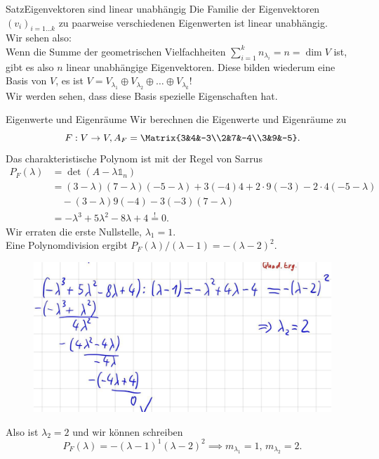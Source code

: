 \begin{Satz}{Satz}{Eigenvektoren sind linear unabhängig}
Die Familie der Eigenvektoren $(v_i)_{i=1...k}$ zu paarweise verschiedenen Eigenwerten ist linear unabhängig.\\
Wir sehen also:\\
Wenn die Summe der geometrischen Vielfachheiten $\sum_{i=1}^k n_{\lambda_i}=n=\dim V$ ist, gibt es also $n$ linear unabhängige Eigenvektoren. Diese bilden wiederum eine Basis von $V$, es ist $V=V_{\lambda_1}\oplus V_{\lambda_2}\oplus\ldots\oplus V_{\lambda_k}$!\\
Wir werden sehen, dass diese Basis spezielle Eigenschaften hat.
\end{Satz}

\begin{Beispiel}{Eigenwerte und Eigenräume}
Wir berechnen die Eigenwerte und Eigenräume zu
\begin{equation*}
F: V\to V, A_F=\Matrix{3&4&-3\\2&7&-4\\3&9&-5}.
\end{equation*}
Das charakteristische Polynom ist mit der Regel von Sarrus
\begin{align*}
P_F(\lambda)&=\det(A-\lambda\mathds{1}_n)\\
&=(3-\lambda)(7-\lambda)(-5-\lambda)+3(-4)4+2\cdot 9(-3)-2\cdot 4(-5-\lambda)\\
&\quad-(3-\lambda)9(-4)-3(-3)(7-\lambda)\\
&=-\lambda^3+5\lambda^2-8\lambda+4\overset{!}{=}0.
\end{align*}
Wir erraten die erste Nullstelle, $\lambda_1=1$.\\
Eine Polynomdivision ergibt $P_F(\lambda)/(\lambda-1)=-(\lambda-2)^2$.\\
\begin{figure}
 \vspace{-15pt}
\includegraphics[width=.35\textwidth]{Dateien/01/01PolDiv.jpg}
 \vspace{-15pt}
\end{figure}
Also ist $\lambda_2=2$ und wir können schreiben
\begin{equation*}
P_F(\lambda)=-(\lambda-1)^1(\lambda-2)^2\implies m_{\lambda_1}=1,\,m_{\lambda_2}=2.

\end{equation*}
\end{Beispiel}
